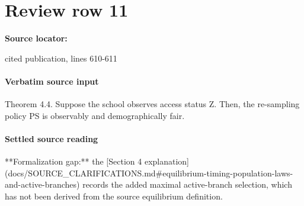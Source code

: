 \documentclass[10pt]{article}
\begin{document}
\section*{Review row 11}
\textbf{Source locator:} {\footnotesize\raggedright cited publication, lines 610-\allowbreak{}611\par}
\paragraph{Verbatim source input}
\begin{ReviewVerbatim}
Theorem 4.4. Suppose the school observes access status Z. Then, the re-sampling policy PS is
observably and demographically fair.
\end{ReviewVerbatim}

\paragraph{Settled source reading}
\begin{sloppypar}
**Formalization gap:\allowbreak{}** the [Section 4 explanation](docs/\allowbreak{}SOURCE\_\allowbreak{}CLARIFICATIONS.\allowbreak{}md\#equilibrium-\allowbreak{}timing-\allowbreak{}population-\allowbreak{}laws-\allowbreak{}and-\allowbreak{}active-\allowbreak{}branches) records the added maximal active-\allowbreak{}branch selection, which has not been derived from the source equilibrium definition.\allowbreak{}
\end{sloppypar}
\end{document}
